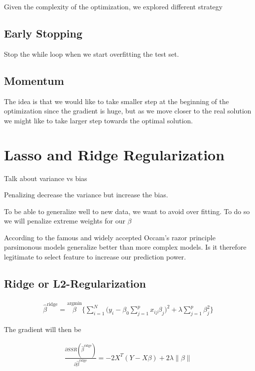 \documentclass[conference]{IEEEtran}
\begin{document}
Given the complexity of the optimization, we explored different strategy

\subsection{Early Stopping}

Stop the while loop when we start overfitting the test set.

\subsection{Momentum}

The idea is that we would like to take smaller step at the beginning of the
optimization since the gradient is huge, but as we move closer to the real
solution we might like to take larger step towards the optimal solution.

\section{Lasso and Ridge Regularization}

Talk about variance vs bias

Penalizing decrease the variance but increase the bias.

\cite{bishop2006pattern}

To be able to generalize well to new data, we want to avoid over fitting. To do
so we will penalize extreme weights for our $\beta$

According to the famous  and widely accepted Occam's razor principle parsimonous
models generalize better than more complex models. Is it therefore legitimate to
select feature to increase our prediction power.

\subsection{Ridge or L2-Regularization}

\begin{eqnarray}
  \hat{\beta}^{\text{ridge}} = \stackrel{\text{argmin}}{\beta}
\Bigg\{ \sum_{i=1}^N \bigg(y_i - \beta_0 \sum_{j=1}^p x_{ij} \beta_j \bigg)^2 +
\lambda \sum_{j=1}^p \beta_j^2 \Bigg\}
\end{eqnarray}
\cite{hastie2005elements}

The gradient will then be 

\begin{eqnarray}
  \frac{\partial SSR(\hat{\beta}^{\text{ridge}} )}{\partial
  \hat{\beta}^{\text{ridge}}} = -2 X^T (Y-X \beta) + 2 \lambda \| \beta \|
\end{eqnarray}
\end{document}
